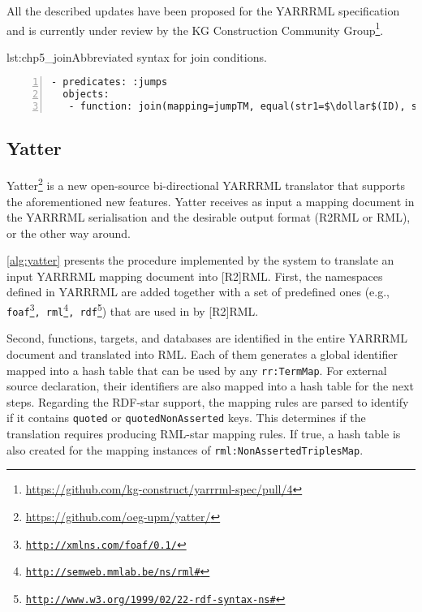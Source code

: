 All the described updates have been proposed for the YARRRML specification and is currently under review by the KG Construction Community Group\footnote{\url{https://github.com/kg-construct/yarrrml-spec/pull/4}}.

\begin{minipage}{\linewidth}
\centering
\begin{captionedlisting}{lst:chp5_join}{Abbreviated syntax for join conditions.}
\centering
{\begin{lstlisting}[numbers=left,basicstyle=\ttfamily\small,columns=flexible]
- predicates: :jumps
  objects:
   - function: join(mapping=jumpTM, equal(str1=$\dollar$(ID), str2=$\dollar$(ID)))
\end{lstlisting}}
\end{captionedlisting}
\end{minipage}





\subsection{Yatter}

Yatter\footnote{\label{foot:yatter}\url{https://github.com/oeg-upm/yatter/}} is a new open-source bi-directional YARRRML translator that supports the aforementioned new features. 
Yatter receives as input a mapping document in the YARRRML serialisation and the desirable output format (R2RML or RML), or the other way around.




\cref{alg:yatter} presents the procedure implemented by the system to translate an input YARRRML mapping document into [R2]RML. 
First, %
the namespaces defined in YARRRML are added together with a set of predefined ones (e.g., \texttt{foaf\footnote{\url{http://xmlns.com/foaf/0.1/}}, rml\footnote{\url{http://semweb.mmlab.be/ns/rml\#}}, rdf\footnote{\url{http://www.w3.org/1999/02/22-rdf-syntax-ns\#}}}) that are used in by [R2]RML. 



Second, functions, targets, and databases are identified in the entire YARRRML document and translated into RML. Each of them generates a global identifier mapped into a hash table that can be used by any \texttt{rr:TermMap}. For external source declaration, their identifiers are also mapped into a hash table for the next steps.
Regarding the RDF-star support, the mapping rules are parsed to identify if it contains \texttt{quoted} or \texttt{quotedNonAsserted} keys.
This determines if the translation requires producing RML-star mapping rules.
If true, a hash table is also created for the mapping instances of \texttt{rml:NonAssertedTriplesMap}.


